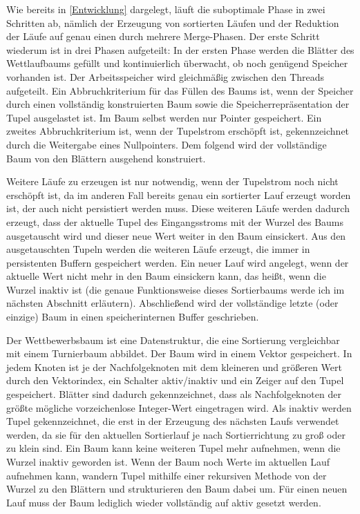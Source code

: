 \documentclass[a4paper,12pt,twoside]{article}
\begin{document}
Wie bereits in \autoref{Entwicklung} dargelegt, läuft die suboptimale Phase in zwei Schritten ab, nämlich der Erzeugung von sortierten Läufen und der Reduktion der Läufe auf genau einen durch mehrere Merge-Phasen. Der erste Schritt wiederum ist in drei Phasen aufgeteilt: In der ersten Phase werden die Blätter des Wettlaufbaums gefüllt und kontinuierlich überwacht, ob noch genügend Speicher vorhanden ist. Der Arbeitsspeicher wird gleichmäßig zwischen den Threads aufgeteilt. Ein Abbruchkriterium für das Füllen des Baums ist, wenn der Speicher durch einen vollständig konstruierten Baum sowie die Speicherrepräsentation der Tupel ausgelastet ist. Im Baum selbst werden nur Pointer gespeichert. Ein zweites Abbruchkriterium ist, wenn der Tupelstrom erschöpft ist, gekennzeichnet durch die Weitergabe eines Nullpointers. Dem folgend wird der vollständige Baum von den Blättern ausgehend konstruiert.

Weitere Läufe zu erzeugen ist nur notwendig, wenn der Tupelstrom noch nicht erschöpft ist, da im anderen Fall bereits genau ein sortierter Lauf erzeugt worden ist, der auch nicht persistiert werden muss. Diese weiteren Läufe werden dadurch erzeugt, dass der aktuelle Tupel des Eingangsstroms mit der Wurzel des Baums ausgetauscht wird und dieser neue Wert weiter in den Baum einsickert. Aus den ausgetauschten Tupeln werden die weiteren Läufe erzeugt, die immer in persistenten Buffern gespeichert werden. Ein neuer Lauf wird angelegt, wenn der aktuelle Wert nicht mehr in den Baum einsickern kann, das heißt, wenn die Wurzel inaktiv ist (die genaue Funktionsweise dieses Sortierbaums werde ich im nächsten Abschnitt erläutern). Abschließend wird der vollständige letzte (oder einzige) Baum in einen speicherinternen Buffer geschrieben.

Der Wettbewerbsbaum ist eine Datenstruktur, die eine Sortierung vergleichbar mit einem Turnierbaum abbildet. Der Baum wird in einem Vektor gespeichert. In jedem Knoten ist je der Nachfolgeknoten mit dem kleineren und größeren Wert durch den Vektorindex, ein Schalter aktiv/inaktiv und ein Zeiger auf den Tupel gespeichert. Blätter sind dadurch gekennzeichnet, dass als Nachfolgeknoten der größte mögliche vorzeichenlose Integer-Wert eingetragen wird. Als inaktiv werden Tupel gekennzeichnet, die erst in der Erzeugung des nächsten Laufs verwendet werden, da sie für den aktuellen Sortierlauf je nach Sortierrichtung zu groß oder zu klein sind. Ein Baum kann keine weiteren Tupel mehr aufnehmen, wenn die Wurzel inaktiv geworden ist. Wenn der Baum noch Werte im aktuellen Lauf aufnehmen kann, wandern Tupel mithilfe einer rekursiven Methode von der Wurzel zu den Blättern und strukturieren den Baum dabei um. Für einen neuen Lauf muss der Baum lediglich wieder vollständig auf aktiv gesetzt werden. 
\end{document}
